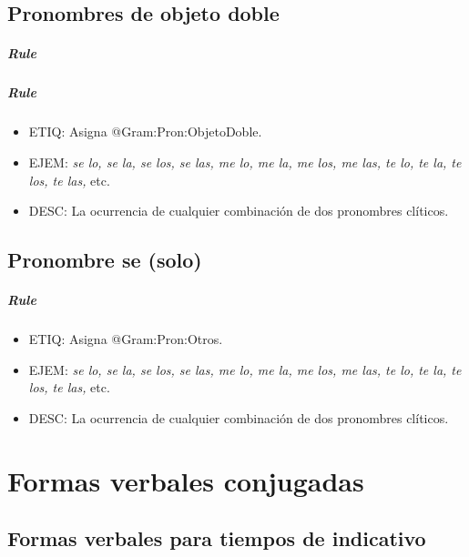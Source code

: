 \documentclass[11pt]{report}
\begin{document}
\section{Pronombres de objeto doble}
\paragraph*{Rule}
\paragraph*{Rule}
\begin{itemize}
\item ETIQ: Asigna @Gram:Pron:ObjetoDoble.
\item EJEM: \emph{se lo, se la, se los, se las, me lo, me la, me los, me las, te lo, te la, te los, te las,} etc.
\item DESC: La ocurrencia de cualquier combinación de dos pronombres clíticos.
\end{itemize}

\section{Pronombre se (solo)}
\paragraph*{Rule}
\begin{itemize}
\item ETIQ: Asigna @Gram:Pron:Otros.
\item EJEM: \emph{se lo, se la, se los, se las, me lo, me la, me los, me las, te lo, te la, te los, te las,} etc.
\item DESC: La ocurrencia de cualquier combinación de dos pronombres clíticos.
\end{itemize}

\chapter{Formas verbales conjugadas}
\section{Formas verbales para tiempos de indicativo}
\end{document}
